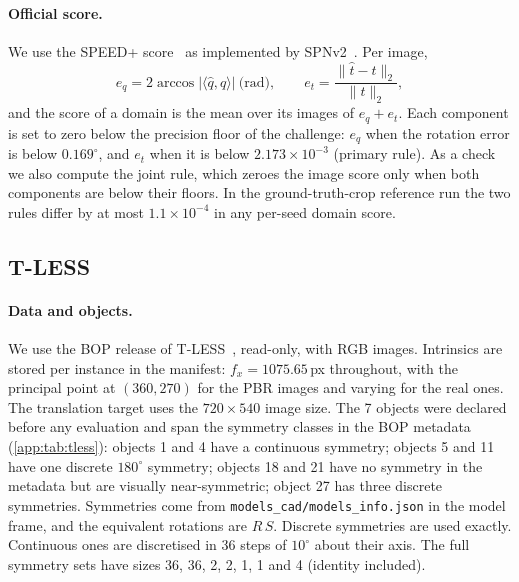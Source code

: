 \paragraph{Official score.}
We use the SPEED+ score~\cite{park2022speedplus,park2023spec} as implemented by SPNv2~\cite{park2024spnv2}. Per image,
\begin{equation*}
  e_q=2\arccos|\langle\hat q,q\rangle|\ \text{(rad)},\qquad e_t=\frac{\|\hat t-t\|_2}{\|t\|_2},
\end{equation*}
and the score of a domain is the mean over its images of $e_q+e_t$. Each component is set to zero below the precision floor of the challenge: $e_q$ when the rotation error is below $0.169^\circ$, and $e_t$ when it is below $2.173\times10^{-3}$ (primary rule). As a check we also compute the joint rule, which zeroes the image score only when both components are below their floors. In the ground-truth-crop reference run the two rules differ by at most $1.1\times10^{-4}$ in any per-seed domain score.

\subsection{T-LESS}\label{app:tless}

\paragraph{Data and objects.}
We use the BOP release of T-LESS~\cite{hodan2017tless,hodan2020bop}, read-only, with RGB images. Intrinsics are stored per instance in the manifest: $f_x=1075.65$\,px throughout, with the principal point at $(360,270)$ for the PBR images and varying for the real ones. The translation target uses the $720\times540$ image size. The 7 objects were declared before any evaluation and span the symmetry classes in the BOP metadata (\cref{app:tab:tless}):
objects 1 and 4 have a continuous symmetry;
objects 5 and 11 have one discrete $180^\circ$ symmetry;
objects 18 and 21 have no symmetry in the metadata but are visually near-symmetric;
object 27 has three discrete symmetries.
Symmetries come from \texttt{models\_cad/models\_info.json} in the model frame, and the equivalent rotations are $R\,S$. Discrete symmetries are used exactly. Continuous ones are discretised in 36 steps of $10^\circ$ about their axis.
The full symmetry sets have sizes 36, 36, 2, 2, 1, 1 and 4 (identity included).

